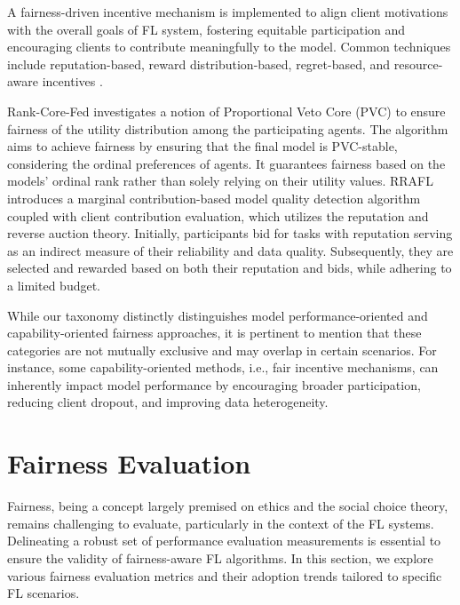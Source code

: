 \documentclass{article}
\begin{document}
A fairness-driven incentive mechanism is implemented to align client motivations with the overall goals of FL system, fostering equitable participation and encouraging clients to contribute meaningfully to the model. Common techniques include reputation-based, reward distribution-based, regret-based, and resource-aware incentives \cite{YangZHWS23}. 

Rank-Core-Fed \cite{rankcorefed2024fair} investigates a notion of Proportional Veto Core (PVC) to ensure fairness of the utility distribution among the participating agents. The algorithm aims to achieve fairness by ensuring that the final model is PVC-stable, considering the ordinal preferences of agents. It guarantees fairness based on the models' ordinal rank rather than solely relying on their utility values.  
RRAFL \cite{Incentive_WWW21} introduces a marginal contribution-based model quality detection algorithm coupled with client contribution evaluation, which utilizes the reputation and reverse auction theory. Initially, participants bid for tasks with reputation serving as an indirect measure of their reliability and
data quality. Subsequently, they are selected and rewarded
based on both their reputation and bids, while adhering to a
limited budget.

While our taxonomy distinctly distinguishes model performance-oriented and capability-oriented fairness approaches, it is pertinent to mention that these categories are not mutually exclusive and may overlap in certain scenarios. For instance, some capability-oriented methods, i.e., fair incentive mechanisms,
can inherently impact model performance by encouraging broader participation, reducing client dropout, and improving data heterogeneity.

\section{Fairness Evaluation}
\label{Sec: Fairness Evaluation}
Fairness, being a concept largely premised on ethics and the social choice theory, remains challenging to evaluate, particularly in the context of the FL systems. Delineating a robust set of performance evaluation measurements is essential to ensure the validity of fairness-aware FL algorithms. In this section, we explore various fairness evaluation metrics and their adoption trends tailored to specific FL scenarios.
\end{document}
